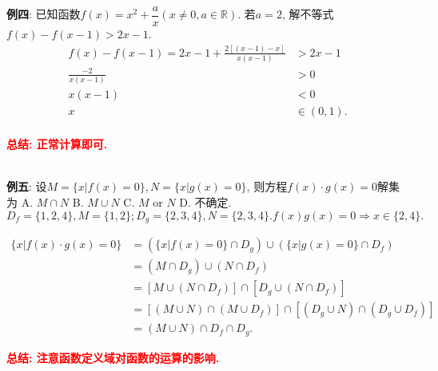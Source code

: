 \documentclass[8pt]{article}
\begin{document}
				\textbf{例四}: 已知函数$f(x)=x^2+\dfrac{a}{x} (x\neq 0, a\in \mathbb{R})$. 若$a=2$, 解不等式$f(x)-f(x-1)>2x-1.$
					~\\

					\begin{align*}
						f(x) - f(x-1) = 2x-1 + \frac{2[(x-1)-x]}{x(x-1)} &> 2x-1\\
						\frac{-2}{x(x-1)} &> 0\\
						x(x-1) &< 0\\
						x &\in (0, 1).\\
					\end{align*}

					\textbf{\textcolor{red}{总结: 正常计算即可.}}

				~\\

				\textbf{例五}: 设$M=\{x|f(x)=0\}, N=\{x|g(x)=0\}$, 则方程$f(x)\cdot g(x) = 0$解集为 A. $M\cap N$ B. $M\cup N$ C. $M \text{ or } N$ D. 不确定.
					~\\

					$D_f = \{1, 2, 4\}, M = \{1, 2\}; D_g = \{2, 3, 4\}, N = \{2, 3, 4\}. f(x) g(x) = 0 \Rightarrow x \in \{2, 4\}.$

					\begin{align*}
					\{x|f(x)\cdot g(x) = 0\} &= \left(\{x|f(x) = 0\} \cap D_g\right) \cup \left(\{x|g(x) = 0\} \cap D_f\right)\\
					&= \left(M \cap D_g \right) \cup \left(N \cap D_f \right)\\
					&= \left[M \cup \left(N \cap D_f \right)\right] \cap \left[D_g \cup \left(N \cap D_f \right)\right]\\
					&= \left[\left(M \cup N\right) \cap \left(M \cup D_f\right) \right] \cap \left[\left(D_g \cup N\right) \cap \left(D_g \cup D_f\right)\right]\\
					&= (M\cup N)\cap D_f \cap D_g.
					\end{align*}

					\textbf{\textcolor{red}{总结: 注意函数定义域对函数的运算的影响.}}

				~\\
\end{document}
